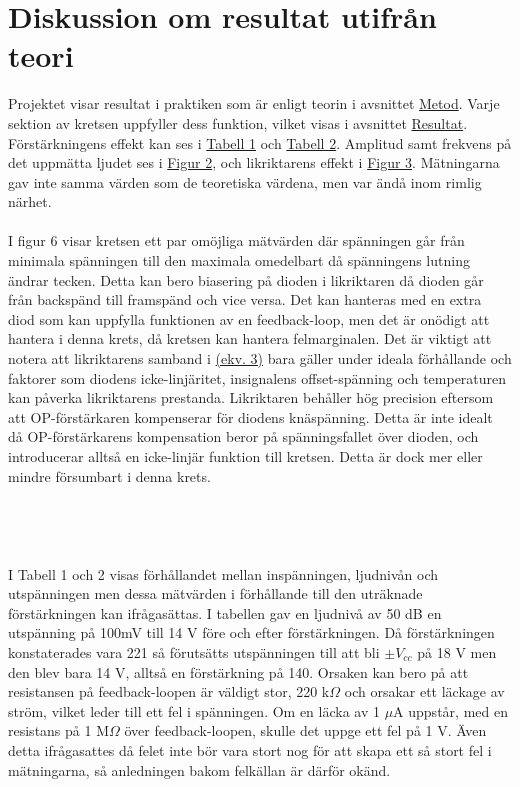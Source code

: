 \documentclass[12pt]{report}
\begin{document}
\section{Diskussion om resultat utifrån teori}
\label{sec:disctheory}
Projektet visar resultat i praktiken som är enligt teorin i avsnittet \hyperref[chap:method]{Metod}. Varje sektion av kretsen uppfyller dess funktion, vilket visas i avsnittet \hyperref[chap:res]{Resultat}. Förstärkningens effekt kan ses i \hyperref[tab:res1]{Tabell 1} och \hyperref[tab:res2]{Tabell 2}. Amplitud samt frekvens på det uppmätta ljudet ses i \hyperref[fig:efterf]{Figur 2}, och likriktarens effekt i \hyperref[fig:lik]{Figur 3}. Mätningarna gav inte samma värden som de teoretiska värdena, men var ändå inom rimlig närhet.
\\\\
I figur 6 visar kretsen ett par omöjliga mätvärden där spänningen går från minimala spänningen till den maximala omedelbart då spänningens lutning ändrar tecken. Detta kan bero biasering på dioden i likriktaren då dioden går från backspänd till framspänd och vice versa. Det kan hanteras med en extra diod som kan uppfylla funktionen av en feedback-loop, men det är onödigt att hantera i denna krets, då kretsen kan hantera felmarginalen. Det är viktigt att notera att likriktarens samband i \hyperref[eq:rect]{(ekv. 3)} bara gäller under ideala förhållande och faktorer som diodens icke-linjäritet, insignalens offset-spänning och temperaturen kan påverka likriktarens prestanda. Likriktaren behåller hög precision eftersom att OP-förstärkaren kompenserar för diodens knäspänning. Detta är inte idealt då OP-förstärkarens kompensation beror på spänningsfallet över dioden, och introducerar alltså en icke-linjär funktion till kretsen. Detta är dock mer eller mindre försumbart i denna krets. 
\\\\\\\\\\
I Tabell 1 och 2 visas förhållandet mellan inspänningen, ljudnivån och utspänningen men dessa mätvärden i förhållande till den uträknade förstärkningen kan ifrågasättas. I tabellen gav en ljudnivå av 50 dB en utspänning på 100mV till 14 V före och efter förstärkningen. Då förstärkningen konstaterades vara 221 så förutsätts utspänningen till att bli $\pm V_{cc}$ på 18 V men den blev bara 14 V, alltså en förstärkning på 140. Orsaken kan bero på att resistansen på feedback-loopen är väldigt stor, 220 k$\Omega$ och orsakar ett läckage av ström, vilket leder till ett fel i spänningen. Om en läcka av 1 $\mu$A uppstår, med en resistans på 1 M$\Omega$ över feedback-loopen, skulle det uppge ett fel på 1 V. Även detta ifrågasattes då felet inte bör vara stort nog för att skapa ett så stort fel i mätningarna, så anledningen bakom felkällan är därför okänd.
\end{document}
